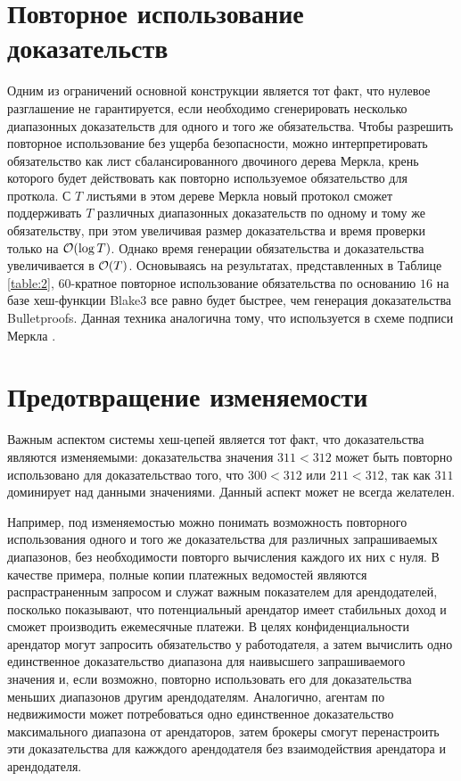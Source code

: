 
\section{Повторное использование доказательств} %
Одним из ограничений основной конструкции является тот факт, что нулевое разглашение не гарантируется, если необходимо сгенерировать несколько диапазонных доказательств для одного и того же обязательства.
Чтобы разрешить повторное использование без ущерба безопасности, можно интерпретировать обязательство как лист сбалансированного двочиного дерева Меркла, крень которого будет действовать как повторно используемое обязательство для проткола.
С $T$ листьями в этом дереве Меркла новый протокол сможет поддерживать $T$ различных диапазонных доказательств по одному и тому же обязательству, при этом увеличивая размер доказательства и время проверки только на $\mathcal{O}(\log T)$.
Однако время генерации обязательства и доказательства увеличивается в $\mathcal{O}(T)$.
Основываясь на результатах, представленных в Таблице \ref{table:2}, 60-кратное повторное использование обязательства по основанию $16$ на базе хеш-функции Blake3 все равно будет быстрее, чем генерация доказательства Bulletproofs.
Данная техника аналогична тому, что используется в схеме подписи Меркла \cite{10.1007/0-387-34805-0_21}.

\section{Предотвращение изменяемости}
Важным аспектом системы хеш-цепей является тот факт, что доказательства являются изменяемыми: доказательства значения $311 < 312$ может быть повторно использовано для доказательствао того, что $300 < 312$ или $211 < 312$, так как $311$ доминирует над данными значениями.
Данный аспект может не всегда желателен.

Например, под изменяемостью можно понимать возможность повторного использования одного и того же доказательства для различных запрашиваемых диапазонов, без необходимости повторго вычисления каждого их них с нуля.
В качестве примера, полные копии платежных ведомостей являются распрастраненным запросом и служат важным показателем для арендодателей, посколько показывают, что потенциальный арендатор имеет стабильных доход и сможет производить ежемесячные платежи.
В целях конфиденциальности арендатор могут запросить обязательство у работодателя, а затем вычислить одно единственное доказательство диапазона для наивысшего запрашиваемого значения и, если возможно, повторно использовать его для доказательства меньших диапазонов другим арендодателям.
Аналогично, агентам по недвижимости может потребоваться одно единственное доказательство максимального диапазона от арендаторов, затем брокеры смогут перенастроить эти доказательства для кажждого арендодателя без взаимодействия арендатора и арендодателя.

